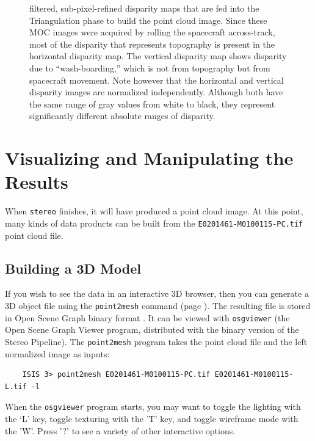 \begin{figure}[b!]
\begin{minipage}{2.7in}
{        filtered, sub-pixel-refined disparity maps that are fed into the
        Triangulation phase to build the point cloud image.  Since
        these MOC images were acquired by rolling the spacecraft
        across-track, most of the disparity that represents topography
        is present in the horizontal disparity map.  The vertical
        disparity map shows disparity due to ``wash-boarding,'' which
        is not from topography but from spacecraft movement. Note
        however that the horizontal and vertical disparity images are
        normalized independently.  Although both have the same range
        of gray values from white to black, they represent
        significantly different absolute ranges of disparity.}
\end{minipage}
\end{figure}

\clearpage

\section{Visualizing and Manipulating the Results}
\label{visualising}

When \texttt{stereo} finishes, it will have produced a point cloud
image.  At this point, many kinds of data products can be built from
the \texttt{E0201461-M0100115-PC.tif} point cloud file.

\subsection{Building a 3D Model}

If you wish to see the data in an interactive 3D browser, then you can
generate a 3D object file using the \texttt{point2mesh} command (page
\pageref{point2mesh}). The resulting file is stored in Open Scene
Graph binary format \cite{OSG_website}.  It can be viewed with
\texttt{osgviewer} (the Open Scene Graph Viewer program, distributed
with the binary version of the Stereo Pipeline).  The
\texttt{point2mesh} program takes the point cloud file and the left
normalized image as inputs:

\begin{verbatim}
    ISIS 3> point2mesh E0201461-M0100115-PC.tif E0201461-M0100115-L.tif -l
\end{verbatim}

\noindent
When the \texttt{osgviewer} program starts, you may want to toggle the
lighting with the `L' key, toggle texturing with the 'T' key, and
toggle wireframe mode with the 'W'.  Press '?' to see a variety of
other interactive options.

